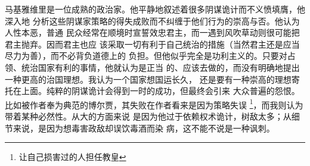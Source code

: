 马基雅维里是一位成熟的政治家。他平静地叙述着很多阴谋诡计而不义愤填膺，他深入地
分析这些阴谋家策略的得失成败而不纠缠于他们行为的崇高与否。他认为人性本恶，普通
民众经常在顺境时宣誓效忠君主，而一遇到风吹草动则很可能把君主抛弃。因而君主也应
该采取一切有利于自己统治的措施（当然君主还是应当尽力为善），而不必背负道德上的
负担。但他似乎完全是功利主义的。只要对占领、统治国家有利的事情，他就认为是正当
的、应该去做的，而没有明确地提出一种更高的治国理想。我认为一个国家想国运长久，
还是要有一种崇高的理想寄托在上面。纯粹的阴谋诡计会得到一时的成功，但最终会引来
大众普遍的怨恨。比如被作者奉为典范的博尔贾，其失败在作者看来是因为策略失误
\footnote{让自己损害过的人担任教皇}，而我则认为带着某种必然性。从大的方面来说
是因为他过于依赖权术诡计，树敌太多；从细节来说，是因为想毒害政敌却误饮毒酒而染
病，这不能不说是一种讽刺。

\printbibliography
\nocite{*}


